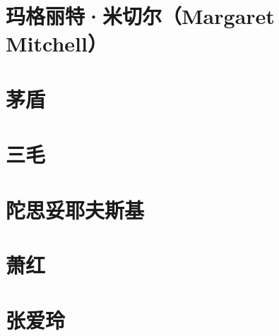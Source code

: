 \documentclass[12pt,utf8]{book}
\begin{document}
\chapter{玛格丽特·米切尔（Margaret Mitchell）}

% 






\chapter{茅盾}

% 














\chapter{三毛}



% 
% 
% 
% 
% 
% 
% 


\chapter{陀思妥耶夫斯基}

% 


\chapter{萧红}



 





\chapter{张爱玲}
\end{document}
